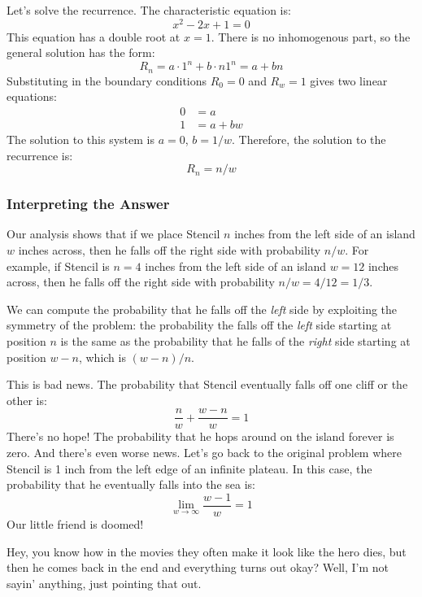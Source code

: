 \begin{figure}[p]

\end{figure}

Let's solve the recurrence.  The characteristic equation is:
%
\[
x^2 - 2 x + 1 = 0
\]
%
This equation has a double root at $x = 1$.  There is no inhomogenous
part, so the general solution has the form:
%
\[
R_n = a \cdot 1^n + b \cdot n 1^n = a + b n
\]
%
Substituting in the boundary conditions $R_0 = 0$ and $R_w = 1$ gives
two linear equations:
%
\begin{align*}
0 & = a \\
1 & = a + b w
\end{align*}
%
The solution to this system is $a = 0$, $b = 1 / w$.  Therefore, the
solution to the recurrence is:
%
\[
R_n = n / w
\]

\subsubsection*{Interpreting the Answer}

Our analysis shows that if we place Stencil $n$ inches from the left
side of an island $w$ inches across, then he falls off the right side
with probability $n / w$.  For example, if Stencil is $n = 4$ inches
from the left side of an island $w = 12$ inches across, then he falls
off the right side with probability $n / w = 4 / 12 = 1 / 3$.

We can compute the probability that he falls off the \textit{left}
side by exploiting the symmetry of the problem: the probability the
falls off the \textit{left} side starting at position $n$ is the same
as the probability that he falls of the \textit{right} side starting
at position $w - n$, which is $(w - n) / n$.

This is bad news.  The probability that Stencil eventually falls off
one cliff or the other is:
%
\[
\frac{n}{w} + \frac{w - n}{w} = 1
\]
%
There's no hope!  The probability that he hops around on the island
forever is zero.  And there's even worse news.  Let's go back to the
original problem where Stencil is 1 inch from the left edge of an
infinite plateau.  In this case, the probability that he eventually
falls into the sea is:
%
\[
\lim_{w \to \infty} \frac{w - 1}{w} = 1
\]
%
Our little friend is doomed!

Hey, you know how in the movies they often make it look like the hero
dies, but then he comes back in the end and everything turns out okay?
Well, I'm not sayin' anything, just pointing that out.

